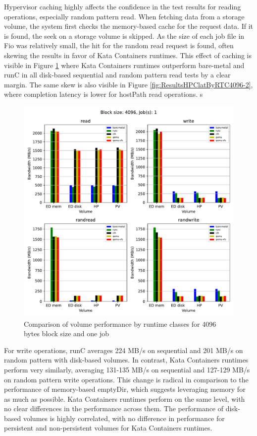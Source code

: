 Hypervisor caching highly affects the confidence in the test results for reading operations, especially random pattern read. When fetching data from a storage volume, the system first checks the memory-based cache for the request data. If it is found, the seek on a storage volume is skipped. As the size of each job file in Fio was relatively small, the hit for the random read request is found, often skewing the results in favor of Kata Containers runtimes. This effect of caching is visible in Figure \ref{fig:ResultsVolumeByRTC4096-1} where Kata Containers runtimes outperform bare-metal and runC in all disk-based sequential and random pattern read tests by a clear margin. The same skew is also visible in Figure \ref{fig:ResultsHPClatByRTC4096-2}, where completion latency is lower for hostPath read operations.
s
\begin{figure}[ht]
  \begin{center}
    \includegraphics[width=12cm]{results/subplot_bw_by_volume_with_bare(4096,1).pdf}
    \caption{Comparison of volume performance by runtime classes for 4096 bytes block size and one job}
    \label{fig:ResultsVolumeByRTC4096-1}
  \end{center}
\end{figure}

For write operations, runC averages 224 MB/s on sequential and 201 MB/s on random pattern with disk-based volumes. In contrast, Kata Containers runtimes perform very similarly, averaging 131-135 MB/s on sequential and 127-129 MB/s on random pattern write operations. This change is radical in comparison to the performance of memory-based emptyDir, which suggests leveraging memory for as much as possible. Kata Containers runtimes perform on the same level, with no clear differences in the performance across them. The performance of disk-based volumes is highly correlated, with no difference in performance for persistent and non-persistent volumes for Kata Containers runtimes.
    
